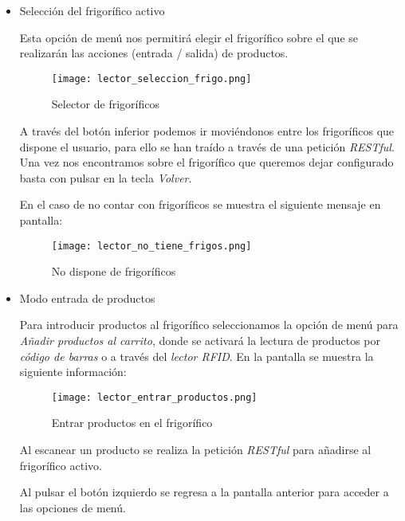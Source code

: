 \begin{itemize}

    \item Selección del frigorífico activo

        Esta opción de menú nos permitirá elegir el frigorífico sobre el que se realizarán las acciones (entrada / salida) de productos.

        \begin{figure}[h!]
            \centering
            \texttt{[image: lector\_seleccion\_frigo.png]}
            \caption{Selector de frigoríficos}\label{fig:lector_seleccion_frigo}
        \end{figure}


        A través del botón inferior podemos ir moviéndonos entre los frigoríficos que dispone el usuario, para ello se han traído a través de una petición \emph{RESTful}. Una vez nos encontramos sobre el frigorífico que queremos dejar configurado basta con pulsar en la tecla \emph{Volver}.

        En el caso de no contar con frigoríficos se muestra el siguiente mensaje en pantalla:

        \begin{figure}[h!]
            \centering
            \texttt{[image: lector\_no\_tiene\_frigos.png]}
            \caption{No dispone de frigoríficos}\label{fig:lector_no_tiene_frigos}
        \end{figure}

    \item Modo entrada de productos

        Para introducir productos al frigorífico seleccionamos la opción de menú para \emph{Añadir productos al carrito}, donde se activará la lectura de productos por \emph{código de barras} o a través del \emph{lector RFID}. En la pantalla se muestra la siguiente información:

        \begin{figure}[h!]
            \centering
            \texttt{[image: lector\_entrar\_productos.png]}
            \caption{Entrar productos en el frigorífico}\label{fig:lector_entrar_productos}
        \end{figure}

        Al escanear un producto se realiza la petición \emph{RESTful} para añadirse al frigorífico activo.

        Al pulsar el botón izquierdo se regresa a la pantalla anterior para acceder a las opciones de menú.


\end{itemize}
